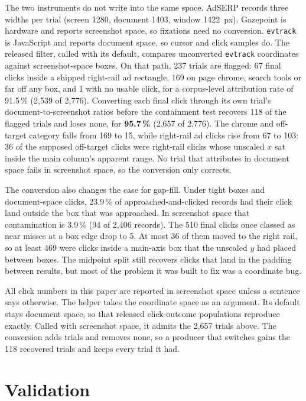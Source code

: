 \documentclass[sigconf,authorversion,natbib=true]{acmart}
\begin{document}
The two instruments do not write into the same space. AdSERP records three widths per trial (screen 1280, document 1403, window 1422~px). Gazepoint is hardware and reports screenshot space, so fixations need no conversion. \texttt{evtrack} is JavaScript and reports document space, so cursor and click samples do. The released filter, called with its default, compares unconverted \texttt{evtrack} coordinates against screenshot-space boxes. On that path, 237 trials are flagged: 67 final clicks inside a shipped right-rail ad rectangle, 169 on page chrome, search tools or far off any box, and 1 with no usable click, for a corpus-level attribution rate of 91.5\,\% (2,539 of 2,776). Converting each final click through its own trial's document-to-screenshot ratios before the containment test recovers 118 of the flagged trials and loses none, for \textbf{95.7\,\%} (2,657 of 2,776). The chrome and off-target category falls from 169 to 15, while right-rail ad clicks rise from 67 to 103: 36 of the supposed off-target clicks were right-rail clicks whose unscaled $x$ sat inside the main column's apparent range. No trial that attributes in document space fails in screenshot space, so the conversion only corrects.

The conversion also changes the case for gap-fill. Under tight boxes and document-space clicks, 23.9\,\% of approached-and-clicked records had their click land outside the box that was approached. In screenshot space that contamination is 3.9\,\% (94 of 2,406 records). The 510 final clicks once classed as near misses at a box edge drop to 5. At most 36 of them moved to the right rail, so at least 469 were clicks inside a main-axis box that the unscaled $y$ had placed between boxes. The midpoint split still recovers clicks that land in the padding between results, but most of the problem it was built to fix was a coordinate bug.

All click numbers in this paper are reported in screenshot space unless a sentence says otherwise. The  helper takes the coordinate space as an argument. Its default stays document space, so that released click-outcome populations reproduce exactly. Called with screenshot space, it admits the 2,657 trials above. The conversion adds trials and removes none, so a producer that switches gains the 118 recovered trials and keeps every trial it had.

\section{Validation}\label{sec:validation}
\end{document}
